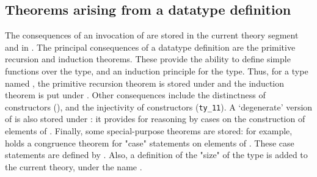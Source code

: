 \subsection{Theorems arising from a datatype definition}

 The consequences of an invocation of  are stored in the
current theory segment and in . The principal consequences
 of a datatype definition are the primitive recursion and induction theorems.
 These provide the ability to define simple functions over the type, and
 an induction principle for the type. Thus, for a type named ,
 the primitive recursion theorem is stored under  and
 the induction theorem is put under . Other
 consequences include the distinctness of constructors (),
 and the injectivity of constructors (\verb+ty_11+). A `degenerate' version of
  is also stored under : it provides 
 for reasoning by cases on the construction of elements of . 
 Finally, some special-purpose theorems are stored: for example,
  holds a congruence theorem for "case" statements 
 on elements of . These 
 case statements are defined by . Also, a definition of 
 the "size" of the type is added to the current theory, under the name 
 .

